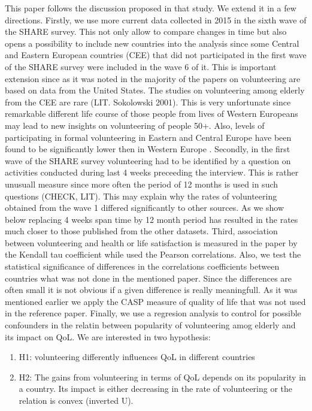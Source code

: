 \documentclass[10pt, letterpaper]{article}
\begin{document}
\begin{spacing}{1.4}
This paper follows the discussion proposed in that study. We extend it in a few directions. Firstly, we use more current data collected in 2015 in the sixth wave of the SHARE survey. This not only allow to compare changes in time but also opens a possibility to include new countries into the analysis since some Central and Eastern European countries (CEE) that did not participated in the first wave of the SHARE survey were included in the wave 6 of it. This is important extension since as it was noted in \citep{casiday08} the majority of the papers on volunteering are based on data from the United States. The studies on volunteering among elderly from the CEE are rare (LIT. Sokolowski 2001). This is very unfortunate since remarkable different life course of those people from lives of Western Europeans may lead to new insights on volunteering of people 50+. Also, levels of participating in formal volunteering in Eastern and Central Europe have been found to be significantly lower then in Western Europe \citet{plagnol10}. Secondly, in the first wave of the SHARE survey volunteering had to be identified by a question on activities conducted during last 4 weeks preceeding the interview. This is rather unusuall measure since more often the period of 12 months is used in such questions (CHECK, LIT). This may explain why the rates of volunteering obtained from the wave 1 differed significantly to other sources. As we show below replacing 4 weeks span time by 12 month period has resulted in the rates much closer to those published from the other datasets. Third, association between volunteering and health or life satisfaction is measured in the paper by the Kendall tau coefficient while \citet{haski09} used the Pearson correlations. Also, we test the statistical significance of differences in the correlations coefficients between countries what was not done in the mentioned paper.  Since the differences are often small it is not obvious if a given difference is really meaningfull. As it was mentioned earlier  we apply the CASP measure of quality of life that was not used in the reference paper. Finally, we use a regresion analysis to control for possible confounders in the relatin between popularity of volunteering amog elderly and its impact on QoL.  We are interested in two hypothesis: \\

\begin{enumerate}
\item H1: volunteering  differently influences QoL in different countries
\item H2: The gains from volunteering in terms of QoL depends on its popularity in a country. Its impact is either decreasing in the rate of volunteering or the relation is convex (inverted U).
\end{enumerate}


\end{spacing}
\end{document}
